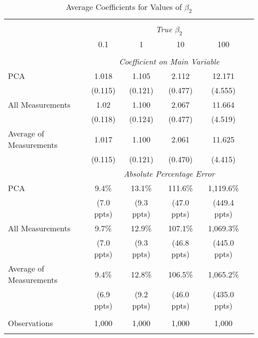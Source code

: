 \begin{table}[!htbp] \centering
  \caption{Average Coefficients for Values of $\beta_2$ \label{sim_beta2_3}}
\begin{tabular}{@{\extracolsep{5pt}}lccccc}
\\[-1.8ex]\hline
\hline \\[-1.8ex]
& \multicolumn{5}{c}{\textit{True $\beta_2$}} \
\cr 
\\[-1.8ex] & 0.1 & 1 & 10 & 100 \\
\hline \\[-1.8ex]
& \multicolumn{5}{c}{\textit{Coefficient on Main Variable}} \\
 PCA & 1.018 & 1.105 & 2.112 & 12.171  \\
  & (0.115) & (0.121) & (0.477) & (4.555)\\
 All Measurements & 1.02 & 1.100 & 2.067 & 11.664  \\
  & (0.118) & (0.124) & (0.477) & (4.519)\\
 Average of Measurements & 1.017 & 1.100 & 2.061 & 11.625  \\
  & (0.115) & (0.121) & (0.470) & (4.415)\\
& \multicolumn{5}{c}{\textit{Absolute Percentage Error}} \\
  PCA & 9.4\% & 13.1\% & 111.6\% & 1,119.6\%  \\
   & (7.0 ppts) & (9.3 ppts) & (47.0 ppts) & (449.4 ppts)\\
All Measurements & 9.7\% & 12.9\% & 107.1\% & 1,069.3\%  \\
  & (7.0 ppts) & (9.3 ppts) & (46.8 ppts) & (445.0 ppts)\\
  Average of Measurements & 9.4\% & 12.8\% & 106.5\% & 1,065.2\%  \\
  & (6.9 ppts) & (9.2 ppts) & (46.0 ppts) & (435.0 ppts)\\
\hline \\[-1.8ex]
 Observations & 1,000 & 1,000 & 1,000 & 1,000 &\\
\hline
\hline \\[-1.8ex]
\end{tabular}
\end{table}
